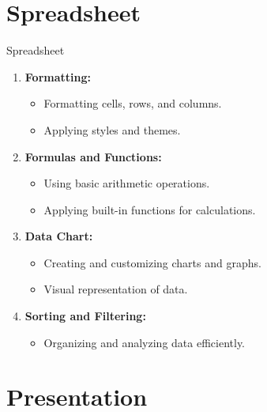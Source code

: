 \section{Spreadsheet}

\begin{frame}{Spreadsheet}
  \begin{enumerate}
    \item \textbf{Formatting:}
      \begin{itemize}
        \item Formatting cells, rows, and columns.
        \item Applying styles and themes.
      \end{itemize}
    \item \textbf{Formulas and Functions:}
      \begin{itemize}
        \item Using basic arithmetic operations.
        \item Applying built-in functions for calculations.
      \end{itemize}
    \item \textbf{Data Chart:}
      \begin{itemize}
        \item Creating and customizing charts and graphs.
        \item Visual representation of data.
      \end{itemize}
    \item \textbf{Sorting and Filtering:}
      \begin{itemize}
        \item Organizing and analyzing data efficiently.
      \end{itemize}
  \end{enumerate}
\end{frame}

\section{Presentation}

